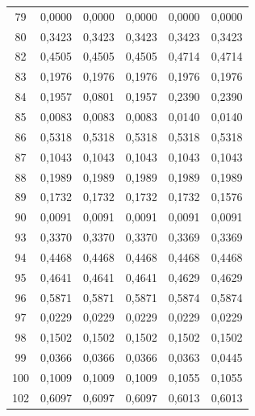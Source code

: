 \begin{center}
\begin{longtable}{c|r|r|r|r|r}
79 & 0,0000 & 0,0000 & 0,0000 & 0,0000 & 0,0000 \\

80 & 0,3423 & 0,3423 & 0,3423 & 0,3423 & 0,3423 \\

82 & 0,4505 & 0,4505 & 0,4505 & 0,4714 & 0,4714 \\

83 & 0,1976 & 0,1976 & 0,1976 & 0,1976 & 0,1976 \\

84 & 0,1957 & 0,0801 & 0,1957 & 0,2390 & 0,2390 \\

85 & 0,0083 & 0,0083 & 0,0083 & 0,0140 & 0,0140 \\

86 & 0,5318 & 0,5318 & 0,5318 & 0,5318 & 0,5318 \\

87 & 0,1043 & 0,1043 & 0,1043 & 0,1043 & 0,1043 \\

88 & 0,1989 & 0,1989 & 0,1989 & 0,1989 & 0,1989 \\

89 & 0,1732 & 0,1732 & 0,1732 & 0,1732 & 0,1576 \\

90 & 0,0091 & 0,0091 & 0,0091 & 0,0091 & 0,0091 \\

93 & 0,3370 & 0,3370 & 0,3370 & 0,3369 & 0,3369 \\

94 & 0,4468 & 0,4468 & 0,4468 & 0,4468 & 0,4468 \\

95 & 0,4641 & 0,4641 & 0,4641 & 0,4629 & 0,4629 \\

96 & 0,5871 & 0,5871 & 0,5871 & 0,5874 & 0,5874 \\

97 & 0,0229 & 0,0229 & 0,0229 & 0,0229 & 0,0229 \\

98 & 0,1502 & 0,1502 & 0,1502 & 0,1502 & 0,1502 \\

99 & 0,0366 & 0,0366 & 0,0366 & 0,0363 & 0,0445 \\

100 & 0,1009 & 0,1009 & 0,1009 & 0,1055 & 0,1055 \\

102 & 0,6097 & 0,6097 & 0,6097 & 0,6013 & 0,6013 \\


\end{longtable}
\end{center}
